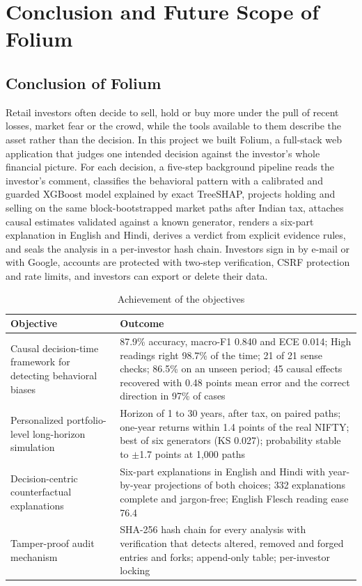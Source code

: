 \chapter{Conclusion and Future Scope of Folium}
\section{Conclusion of Folium}
Retail investors often decide to sell, hold or buy more under the pull of recent losses, market fear or the crowd, while the tools available to them describe the asset rather than the decision. In this project we built Folium, a full-stack web application that judges one intended decision against the investor's whole financial picture. For each decision, a five-step background pipeline reads the investor's comment, classifies the behavioral pattern with a calibrated and guarded XGBoost model explained by exact TreeSHAP, projects holding and selling on the same block-bootstrapped market paths after Indian tax, attaches causal estimates validated against a known generator, renders a six-part explanation in English and Hindi, derives a verdict from explicit evidence rules, and seals the analysis in a per-investor hash chain. Investors sign in by e-mail or with Google, accounts are protected with two-step verification, CSRF protection and rate limits, and investors can export or delete their data.

\begin{table}[H]
\centering
\small
\begin{tabularx}{\textwidth}{|P{3.8cm}|L|}
\hline
\textbf{Objective} & \textbf{Outcome} \\
\hline
Causal decision-time framework for detecting behavioral biases & 87.9\% accuracy, macro-F1 0.840 and ECE 0.014; High readings right 98.7\% of the time; 21 of 21 sense checks; 86.5\% on an unseen period; 45 causal effects recovered with 0.48 points mean error and the correct direction in 97\% of cases \\
\hline
Personalized portfolio-level long-horizon simulation & Horizon of 1 to 30 years, after tax, on paired paths; one-year returns within 1.4 points of the real NIFTY; best of six generators (KS 0.027); probability stable to $\pm$1.7 points at 1,000 paths \\
\hline
Decision-centric counterfactual explanations & Six-part explanations in English and Hindi with year-by-year projections of both choices; 332 explanations complete and jargon-free; English Flesch reading ease 76.4 \\
\hline
Tamper-proof audit mechanism & SHA-256 hash chain for every analysis with verification that detects altered, removed and forged entries and forks; append-only table; per-investor locking \\
\hline
\end{tabularx}
\caption{Achievement of the objectives}
\label{tab:achieved}
\end{table}

